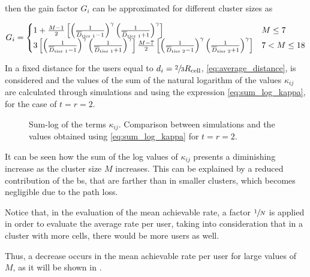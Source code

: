 \noindent
then the gain factor $G_i$ can be approximated for different cluster sizes as

\begin{equation} \label{eq:cluster_gain_value}
    G_i = \begin{cases}
    1 + \frac{M - 1}{2}\left[ \left( \frac{1}{\overline{D}_{\text{tier 1}} - 1}\right)^{\gamma}
    \left( \frac{1}{\overline{D}_{\text{tier 1}} + 1}\right)^{\gamma} \right]
    & M \leq 7 \\
    3 \left[ \left( \frac{1}{\overline{D}_{\text{tier 1}} - 1}\right)^{\gamma}
    \left( \frac{1}{\overline{D}_{\text{tier 1}} + 1}\right)^{\gamma} \right]
    \frac{M - 7}{2} \left[ \left( \frac{1}{\overline{D}_{\text{tier 2}} - 1}\right)^{\gamma}
    \left( \frac{1}{\overline{D}_{\text{tier 2}} + 1}\right)^{\gamma} \right]
    & 7 < M \leq 18
    \end{cases}
\end{equation}

In  a fixed distance for the users equal to $d_{i} =
\sfrac{2}{3}R_{\text{cell}}$, \eqref{eq:average_distance}, is considered and the values
of the sum of the natural logarithm of the values $\kappa_{ij}$ are calculated
through simulations and using the expression \eqref{eq:sum_log_kappa}, for the
case of $t = r = 2$.

\begin{figure}[t]
\begin{center}
    \dummybox
\end{center}
\caption{Sum-log of the terms $\kappa_{ij}$. Comparison between simulations and
the values obtained using \eqref{eq:sum_log_kappa} for $ t = r = 2$.}
\label{fig:sum_log_kappa}
\end{figure}

It can be seen how the sum of the log values of $\kappa_{ij}$ presents a
diminishing increase as the cluster size $M$ increases. This can be explained by
a reduced contribution of the \gls{bs}, that are farther than in smaller
clusters, which becomes negligible due to the path loss.

Notice that, in the evaluation of the mean achievable rate, a factor
$\sfrac{1}{N}$ is applied in order to evaluate the average rate per user, taking
into consideration that in a cluster with more cells, there would be more users
as well.

Thus, a decrease occurs in the mean achievable rate per user for large values of
$M$, as it will be shown in .


